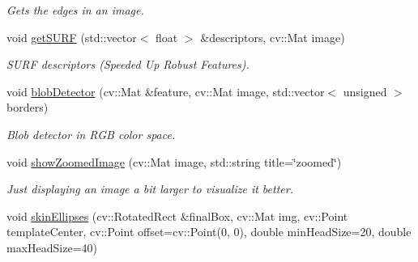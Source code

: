 \begin{DoxyCompactItemize}
\begin{DoxyCompactList}\small\item\em Gets the edges in an image. \item\end{DoxyCompactList}\item 
\hypertarget{classfeatureDetector_ab12cccc40398db5a1df0e9887262e8dc}{
void \hyperlink{classfeatureDetector_ab12cccc40398db5a1df0e9887262e8dc}{getSURF} (std::vector$<$ float $>$ \&descriptors, cv::Mat image)}
\label{classfeatureDetector_ab12cccc40398db5a1df0e9887262e8dc}

\begin{DoxyCompactList}\small\item\em SURF descriptors (Speeded Up Robust Features). \item\end{DoxyCompactList}\item 
\hypertarget{classfeatureDetector_ad2ec4b96d2400b9e867a4a2231170ae9}{
void \hyperlink{classfeatureDetector_ad2ec4b96d2400b9e867a4a2231170ae9}{blobDetector} (cv::Mat \&feature, cv::Mat image, std::vector$<$ unsigned $>$ borders)}
\label{classfeatureDetector_ad2ec4b96d2400b9e867a4a2231170ae9}

\begin{DoxyCompactList}\small\item\em Blob detector in RGB color space. \item\end{DoxyCompactList}\item 
\hypertarget{classfeatureDetector_ac4682e5683fbe70f50ed0acb1dc4c95f}{
void \hyperlink{classfeatureDetector_ac4682e5683fbe70f50ed0acb1dc4c95f}{showZoomedImage} (cv::Mat image, std::string title=\char`\"{}zoomed\char`\"{})}
\label{classfeatureDetector_ac4682e5683fbe70f50ed0acb1dc4c95f}

\begin{DoxyCompactList}\small\item\em Just displaying an image a bit larger to visualize it better. \item\end{DoxyCompactList}\item 
\hypertarget{classfeatureDetector_a525e6e312bc68316f211a26096cad3fa}{
void \hyperlink{classfeatureDetector_a525e6e312bc68316f211a26096cad3fa}{skinEllipses} (cv::RotatedRect \&finalBox, cv::Mat img, cv::Point templateCenter, cv::Point offset=cv::Point(0, 0), double minHeadSize=20, double maxHeadSize=40)}
\label{classfeatureDetector_a525e6e312bc68316f211a26096cad3fa}


\end{DoxyCompactItemize}
